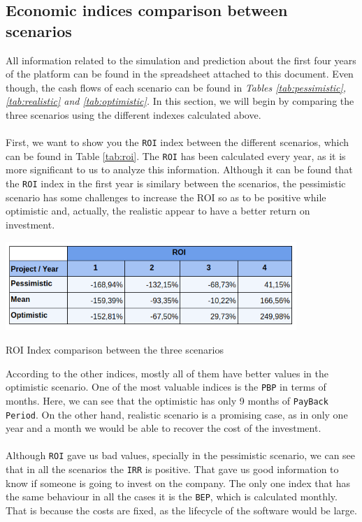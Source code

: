 \subsection{Economic indices comparison between scenarios}
All information related to the simulation and prediction about the first four years of the platform can be found in the spreadsheet attached to this document. Even though, the cash flows of each scenario can be found in \textit{Tables \ref{tab:pessimistic}, \ref{tab:realistic} and \ref{tab:optimistic}.}
In this section, we will begin by comparing the three scenarios using the different indexes calculated above. \\
\\
First, we want to show you the \texttt{ROI} index between the different scenarios, which can be found in Table \ref{tab:roi}. The \texttt{ROI} has been calculated every year, as it is more significant to us to analyze this information. Although it can be found that the \texttt{ROI} index in the first year is similary between the scenarios, the pessimistic scenario has some challenges to increase the ROI so as to be positive while optimistic and, actually, the realistic appear to have a better return on investment.
\begin{table}[H]
	\centering
	\includegraphics[width=11cm]{roi.png}
	\caption{ROI Index comparison between the three scenarios}
	\label{tab:roi}
\end{table}
According to the other indices, mostly all of them have better values in the optimistic scenario. One of the most valuable indices is the \texttt{PBP} in terms of months. Here, we can see that the optimistic has only 9 months of \texttt{PayBack Period}. On the other hand, realistic scenario is a promising case, as in only one year and a month we would be able to recover the cost of the investment.
\\
\\
Although \texttt{ROI} gave us bad values, specially in the pessimistic scenario, we can see that in all the scenarios the \texttt{IRR} is positive. That gave us good information to know if someone is going to invest on the company. The only one index that has the same behaviour in all the cases it is the \texttt{BEP}, which is calculated monthly. That is because the costs are fixed, as the lifecycle of the software would be large.
